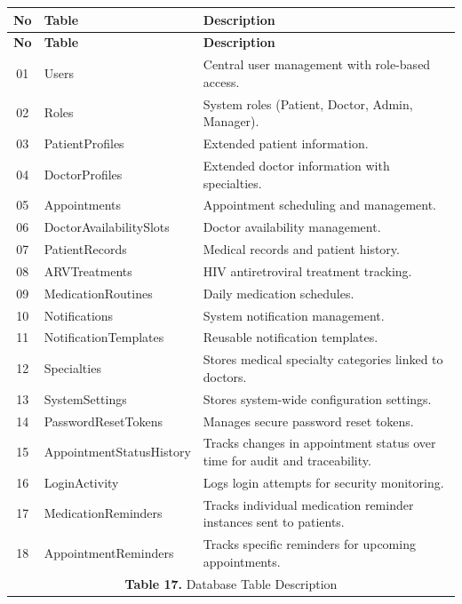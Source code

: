 \documentclass[12pt,a4paper]{article}
\begin{document}
\renewcommand{\arraystretch}{1.5}
\begin{longtable}{|c|p{4cm}|p{9cm}|}
\hline
\textbf{No} & \textbf{Table} & \textbf{Description} \\
\hline
\endfirsthead

\hline
\textbf{No} & \textbf{Table} & \textbf{Description} \\
\hline
\endhead

01 & Users & Central user management with role-based access. \\
\hline
02 & Roles & System roles (Patient, Doctor, Admin, Manager). \\
\hline
03 & PatientProfiles & Extended patient information. \\
\hline
04 & DoctorProfiles & Extended doctor information with specialties. \\
\hline
05 & Appointments & Appointment scheduling and management. \\
\hline
06 & DoctorAvailabilitySlots & Doctor availability management. \\
\hline
07 & PatientRecords & Medical records and patient history. \\
\hline
08 & ARVTreatments & HIV antiretroviral treatment tracking. \\
\hline
09 & MedicationRoutines & Daily medication schedules. \\
\hline
10 & Notifications & System notification management. \\
\hline
11 & NotificationTemplates & Reusable notification templates. \\
\hline
12 & Specialties & Stores medical specialty categories linked to doctors. \\
\hline
13 & SystemSettings & Stores system-wide configuration settings. \\
\hline
14 & PasswordResetTokens & Manages secure password reset tokens. \\
\hline
15 & AppointmentStatusHistory & Tracks changes in appointment status over time for audit and traceability. \\
\hline
16 & LoginActivity & Logs login attempts for security monitoring. \\
\hline
17 & MedicationReminders & Tracks individual medication reminder instances sent to patients. \\
\hline
18 & AppointmentReminders & Tracks specific reminders for upcoming appointments. \\
\hline
\multicolumn{3}{|c|}{\textbf{Table 17.} Database Table Description} \\
\hline
\end{longtable}
\end{document}
